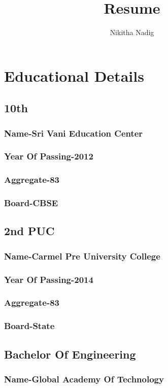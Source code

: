 \documentclass{article}
\renewcommand{\maketitle}{
\begin{center}
	{\huge\bfseries
	\theauthor}
\end{center}
}
\begin{document}
\title{Resume}
\author{Nikitha Nadig}
\maketitle
\section{Educational Details}
\subsection{10th}
\subsubsection{Name-Sri Vani Education Center}
\subsubsection{Year Of Passing-2012}
\subsubsection{Aggregate-83}
\subsubsection{Board-CBSE}
\subsection{2nd PUC}
\subsubsection{Name-Carmel Pre University College}
\subsubsection{Year Of Passing-2014}
\subsubsection{Aggregate-83}
\subsubsection{Board-State}
\subsection{Bachelor Of Engineering}
\subsubsection{Name-Global Academy Of Technology}
\end{document}

